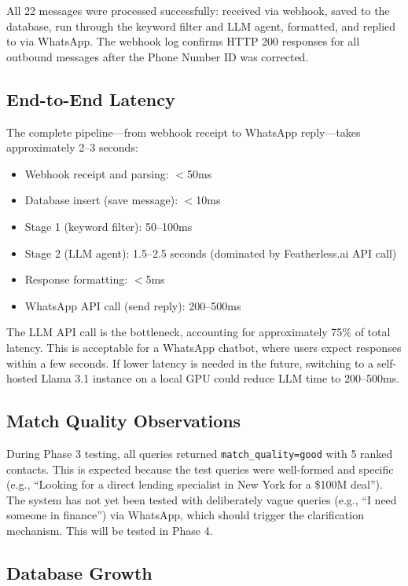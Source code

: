 \documentclass[12pt, a4paper]{report}
\begin{document}
All 22 messages were processed successfully: received via webhook, saved to the database, run through the keyword filter and LLM agent, formatted, and replied to via WhatsApp. The webhook log confirms HTTP 200 responses for all outbound messages after the Phone Number ID was corrected.

\subsection{End-to-End Latency}

The complete pipeline---from webhook receipt to WhatsApp reply---takes approximately 2--3 seconds:

\begin{itemize}[itemsep=3pt]
    \item Webhook receipt and parsing: $<$50ms
    \item Database insert (save message): $<$10ms
    \item Stage 1 (keyword filter): 50--100ms
    \item Stage 2 (LLM agent): 1.5--2.5 seconds (dominated by Featherless.ai API call)
    \item Response formatting: $<$5ms
    \item WhatsApp API call (send reply): 200--500ms
\end{itemize}

The LLM API call is the bottleneck, accounting for approximately 75\% of total latency. This is acceptable for a WhatsApp chatbot, where users expect responses within a few seconds. If lower latency is needed in the future, switching to a self-hosted Llama 3.1 instance on a local GPU could reduce LLM time to 200--500ms.

\subsection{Match Quality Observations}

During Phase 3 testing, all queries returned \texttt{match\_quality=good} with 5 ranked contacts. This is expected because the test queries were well-formed and specific (e.g., ``Looking for a direct lending specialist in New York for a \$100M deal''). The system has not yet been tested with deliberately vague queries (e.g., ``I need someone in finance'') via WhatsApp, which should trigger the clarification mechanism. This will be tested in Phase 4.

\subsection{Database Growth}
\end{document}
